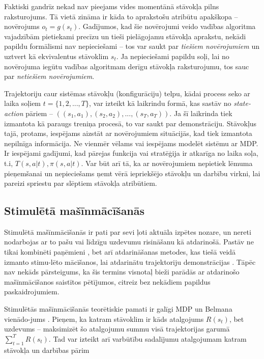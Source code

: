 \documentclass[12pt, a4paper]{article}
\numberwithin{equation}{section} %
\begin{document}
Faktiski gandrīz nekad nav pieejams vides momentānā stāvokļa pilns raksturojums. Tā vietā zināma ir kāda to aprakstošu atribūtu apakškopa -- novērojums $o_t = g(s_t)$. Gadījumos, kad šie novērojumi veido vadības algoritma vajadzībām pietiekami precīzu un tieši pielāgojamu stāvokļa aprakstu, nekādi papildu formālismi nav nepieciešami -- tos var saukt par \textit{tiešiem novērojumiem} un uztvert kā ekvivalentus stāvoklim $s_t$. Ja nepieciešami papildu soļi, lai no novērojuma iegūtu vadības algoritmam derīgu stāvokļa raksturojumu, tos sauc par \textit{netiešiem novērojumiem}.

Trajektoriju caur sistēmas stāvokļu (konfigurāciju) telpu, kādai process seko ar laika soļiem $t = \lbrace 1, 2, ..., T \rbrace$, var izteikt kā laikrindu formā, kas sastāv no \textit{state-action} pāriem -- $((s_1, a_1), (s_2, a_2), ..., (s_T, a_T))$. Ja šī laikrinda tiek izmantota kā paraugs treniņa procesā, to var saukt par demonstrāciju. Stāvokļus tajā, protams, iespējams aizstāt ar novērojumiem situācijās, kad tiek izmantota nepilnīga informācija. Ne vienmēr vēlams vai iespējams modelēt sistēmu ar MDP. Ir iespējami gadījumi, kad pārejas funkcija vai stratēģija ir atkarīga no laika soļa, t.i, $T(s,a \vert t), \pi(s,a \vert t)$. Var būt arī tā, ka ar novērojumiem nepietiek lēmuma pieņemšanai un nepieciešams ņemt vērā iepriekšējo stāvokļu un darbību virkni, lai pareizi spriestu par slēptiem stāvokļa atribūtiem. 

\subsection{Stimulētā mašīnmācīšanās}

Stimulētā mašīnmācīšanās ir pati par sevi ļoti aktuāla izpētes nozare, un nereti nodarbojas ar to pašu vai līdzīgu uzdevumu risināšanu kā atdarinošā. Pastāv ne tikai kombinēti paņēmieni \cite{gupta2019relay, brown2019extrapolating}, bet arī atdarināšanas metodes, kas tiešā veidā izmanto stimu-lēto mācīšanos, lai atdarinātu trajektoriju demonstrācijas \cite{englert2018learning}. Tāpēc nav nekāds pārsteigums, ka šis termins visnotaļ bieži parādās ar atdarinošo mašīnmācīšanos saistītos pētījumos, citreiz bez nekādiem papildus paskaidrojumiem.

Stimulētās mašīnmācīšanās teorētiskie pamati ir galīgi MDP un Belmana vienādo-jums \cite{sutton2018reinforcement}. Pieņem, ka katram stāvoklim ir kāds atalgojums $R(s_t)$, bet uzdevums -- maksimizēt šo atalgojumu summu visā trajektorijas garumā $\sum_{t=1}^T R(s_t)$. Tad var izteikt arī varbūtību sadalījumu atalgojumam katram stāvokļa un darbības pārim
\end{document}
